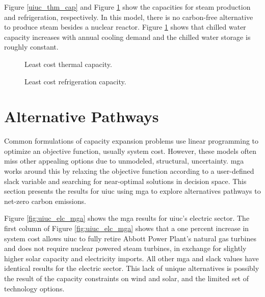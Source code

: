 Figure \ref{uiuc_thm_cap} and Figure \ref{fig:uiuc_chw_cap} show the capacities
for steam production and refrigeration, respectively. In this model, there is no
carbon-free alternative to produce steam besides a nuclear reactor. Figure
\ref{fig:uiuc_chw_cap} shows that chilled water capacity increases with annual
cooling demand and the chilled water storage is roughly constant.

\begin{figure}[H]
  \begin{minipage}{0.48\textwidth}
    \captionsetup{type=figure}
    \centering
    \resizebox{\columnwidth}{!}{}
    \caption[]{Least cost thermal capacity.}
    \label{fig:uiuc_thm_cap}
  \end{minipage}
  \begin{minipage}{0.48\textwidth}
    \centering
    \resizebox{\columnwidth}{!}{}
    \caption[]{Least cost refrigeration capacity.}
    \label{fig:uiuc_chw_cap}
  \end{minipage}
\end{figure}

\section{Alternative Pathways}

Common formulations of capacity expansion problems use linear programming to optimize
an objective function, usually system cost. However, these models often miss
other appealing options due to unmodeled, structural, uncertainty. \gls{mga}
works around this by relaxing the objective function according to a user-defined
slack variable and searching for near-optimal solutions in decision space. This
section presents the results for \gls{uiuc} using \gls{mga} to explore alternatives
pathways to net-zero carbon emissions.

Figure \ref{fig:uiuc_elc_mga} shows the \gls{mga} results for \gls{uiuc}'s electric
sector. The first column of Figure \ref{fig:uiuc_elc_mga} shows that a one percent
increase in system cost allows \gls{uiuc} to fully retire Abbott Power Plant's
natural gas turbines and does not require nuclear powered steam turbines, in exchange
for slightly higher solar capacity and electricity imports. All other \gls{mga}
and slack values have identical results for the electric sector.
This lack of unique alternatives is possibly the result of the capacity constraints on
wind and solar, and the limited set of technology options.

